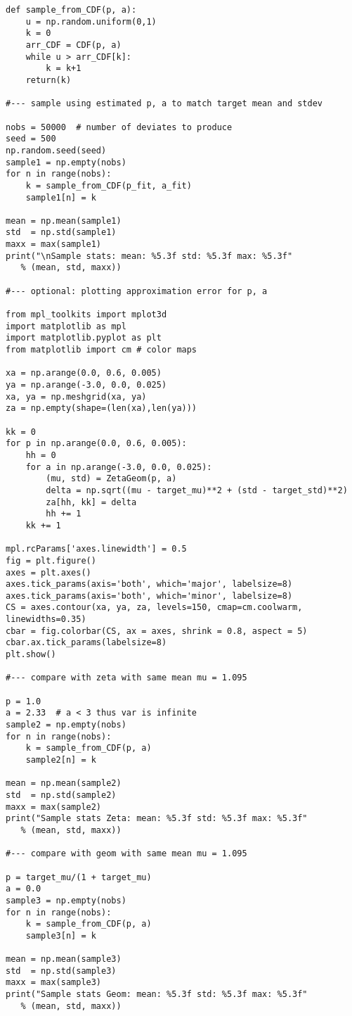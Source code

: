\documentclass[oneside,10pt]{book}
\begin{document}
\begin{lstlisting}
def sample_from_CDF(p, a):
    u = np.random.uniform(0,1)
    k = 0
    arr_CDF = CDF(p, a)
    while u > arr_CDF[k]:
        k = k+1
    return(k)

#--- sample using estimated p, a to match target mean and stdev

nobs = 50000  # number of deviates to produce
seed = 500
np.random.seed(seed)
sample1 = np.empty(nobs)
for n in range(nobs):
    k = sample_from_CDF(p_fit, a_fit)
    sample1[n] = k

mean = np.mean(sample1)
std  = np.std(sample1)
maxx = max(sample1)
print("\nSample stats: mean: %5.3f std: %5.3f max: %5.3f" 
   % (mean, std, maxx))

#--- optional: plotting approximation error for p, a 

from mpl_toolkits import mplot3d
import matplotlib as mpl
import matplotlib.pyplot as plt
from matplotlib import cm # color maps

xa = np.arange(0.0, 0.6, 0.005)
ya = np.arange(-3.0, 0.0, 0.025)
xa, ya = np.meshgrid(xa, ya)
za = np.empty(shape=(len(xa),len(ya)))

kk = 0
for p in np.arange(0.0, 0.6, 0.005):
    hh = 0
    for a in np.arange(-3.0, 0.0, 0.025):
        (mu, std) = ZetaGeom(p, a)
        delta = np.sqrt((mu - target_mu)**2 + (std - target_std)**2)
        za[hh, kk] = delta
        hh += 1
    kk += 1

mpl.rcParams['axes.linewidth'] = 0.5
fig = plt.figure() 
axes = plt.axes()
axes.tick_params(axis='both', which='major', labelsize=8)
axes.tick_params(axis='both', which='minor', labelsize=8)
CS = axes.contour(xa, ya, za, levels=150, cmap=cm.coolwarm, linewidths=0.35)
cbar = fig.colorbar(CS, ax = axes, shrink = 0.8, aspect = 5)
cbar.ax.tick_params(labelsize=8)
plt.show()

#--- compare with zeta with same mean mu = 1.095

p = 1.0
a = 2.33  # a < 3 thus var is infinite
sample2 = np.empty(nobs)
for n in range(nobs):
    k = sample_from_CDF(p, a)
    sample2[n] = k

mean = np.mean(sample2)
std  = np.std(sample2)
maxx = max(sample2)
print("Sample stats Zeta: mean: %5.3f std: %5.3f max: %5.3f" 
   % (mean, std, maxx))

#--- compare with geom with same mean mu = 1.095

p = target_mu/(1 + target_mu)
a = 0.0
sample3 = np.empty(nobs)
for n in range(nobs):
    k = sample_from_CDF(p, a)
    sample3[n] = k

mean = np.mean(sample3)
std  = np.std(sample3)
maxx = max(sample3)
print("Sample stats Geom: mean: %5.3f std: %5.3f max: %5.3f" 
   % (mean, std, maxx))


\end{lstlisting}
\end{document}
